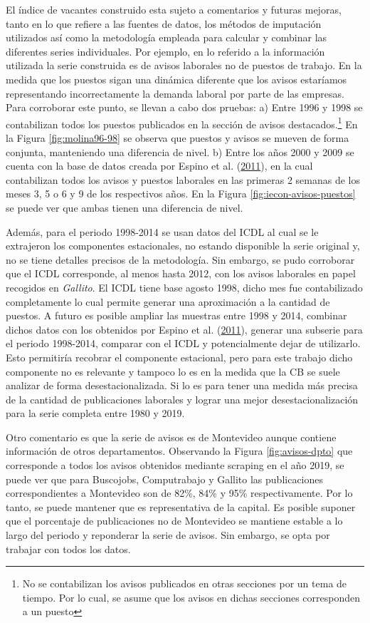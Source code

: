 \documentclass[12pt,oneside]{reedthesis}
\begin{document}
El índice de vacantes construido esta sujeto a comentarios y futuras mejoras, tanto en lo que refiere a las fuentes de datos, los métodos de imputación utilizados así como la metodología empleada para calcular y combinar las diferentes series individuales. Por ejemplo, en lo referido a la información utilizada la serie construida es de avisos laborales no de puestos de trabajo. En la medida que los puestos sigan una dinámica diferente que los avisos estaríamos representando incorrectamente la demanda laboral por parte de las empresas. Para corroborar este punto, se llevan a cabo dos pruebas: a) Entre 1996 y 1998 se contabilizan todos los puestos publicados en la sección de avisos destacados.\footnote{No se contabilizan los avisos publicados en otras secciones por un tema de tiempo. Por lo cual, se asume que los avisos en dichas secciones corresponden a un puesto} En la Figura \ref{fig:molina96-98} se observa que puestos y avisos se mueven de forma conjunta, manteniendo una diferencia de nivel. b) Entre los años 2000 y 2009 se cuenta con la base de datos creada por Espino et al. (\protect\hyperlink{ref-Alma2011}{2011}), en la cual contabilizan todos los avisos y puestos laborales en las primeras 2 semanas de los meses 3, 5 o 6 y 9 de los respectivos años. En la Figura \ref{fig:iecon-avisos-puestos} se puede ver que ambas tienen una diferencia de nivel.

Además, para el periodo 1998-2014 se usan datos del ICDL al cual se le extrajeron los componentes estacionales, no estando disponible la serie original y, no se tiene detalles precisos de la metodología. Sin embargo, se pudo corroborar que el ICDL corresponde, al menos hasta 2012, con los avisos laborales en papel recogidos en \emph{Gallito}. El ICDL tiene base agosto 1998, dicho mes fue contabilizado completamente lo cual permite generar una aproximación a la cantidad de puestos. A futuro es posible ampliar las muestras entre 1998 y 2014, combinar dichos datos con los obtenidos por Espino et al. (\protect\hyperlink{ref-Alma2011}{2011}), generar una subserie para el periodo 1998-2014, comparar con el ICDL y potencialmente dejar de utilizarlo. Esto permitiría recobrar el componente estacional, pero para este trabajo dicho componente no es relevante y tampoco lo es en la medida que la CB se suele analizar de forma desestacionalizada. Si lo es para tener una medida más precisa de la cantidad de publicaciones laborales y lograr una mejor desestacionalización para la serie completa entre 1980 y 2019.

Otro comentario es que la serie de avisos es de Montevideo aunque contiene información de otros departamentos. Observando la Figura \ref{fig:avisos-dpto} que corresponde a todos los avisos obtenidos mediante scraping en el año 2019, se puede ver que para Buscojobs, Computrabajo y Gallito las publicaciones correspondientes a Montevideo son de 82\%, 84\% y 95\% respectivamente. Por lo tanto, se puede mantener que es representativa de la capital. Es posible suponer que el porcentaje de publicaciones no de Montevideo se mantiene estable a lo largo del periodo y reponderar la serie de avisos. Sin embargo, se opta por trabajar con todos los datos.
\end{document}
